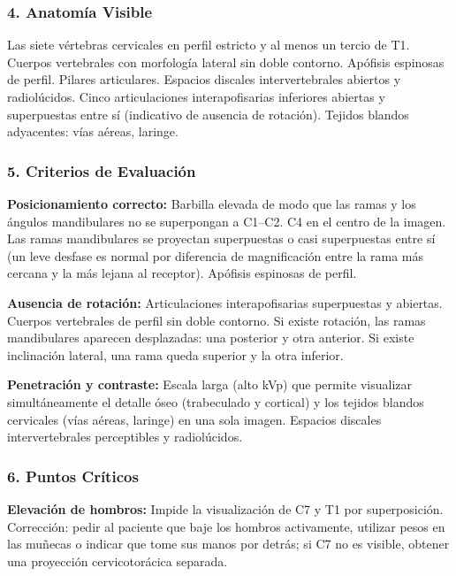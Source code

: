 		\subsubsection*{4. Anatomía Visible}
		
		Las siete vértebras cervicales en perfil estricto y al menos un tercio de T1. Cuerpos vertebrales con morfología lateral sin doble contorno. Apófisis espinosas de perfil. Pilares articulares. Espacios discales intervertebrales abiertos y radiolúcidos. Cinco articulaciones interapofisarias inferiores abiertas y superpuestas entre sí (indicativo de ausencia de rotación). Tejidos blandos adyacentes: vías aéreas, laringe.
		
		\subsubsection*{5. Criterios de Evaluación}
		
		\textbf{Posicionamiento correcto:} Barbilla elevada de modo que las ramas y los ángulos mandibulares no se superpongan a C1--C2. C4 en el centro de la imagen. Las ramas mandibulares se proyectan superpuestas o casi superpuestas entre sí (un leve desfase es normal por diferencia de magnificación entre la rama más cercana y la más lejana al receptor). Apófisis espinosas de perfil.
		
		\textbf{Ausencia de rotación:} Articulaciones interapofisarias superpuestas y abiertas. Cuerpos vertebrales de perfil sin doble contorno. Si existe rotación, las ramas mandibulares aparecen desplazadas: una posterior y otra anterior. Si existe inclinación lateral, una rama queda superior y la otra inferior.
		
		\textbf{Penetración y contraste:} Escala larga (alto kVp) que permite visualizar simultáneamente el detalle óseo (trabeculado y cortical) y los tejidos blandos cervicales (vías aéreas, laringe) en una sola imagen. Espacios discales intervertebrales perceptibles y radiolúcidos.
		
		\subsubsection*{6. Puntos Críticos}
		
		\textbf{Elevación de hombros:} Impide la visualización de C7 y T1 por superposición. Corrección: pedir al paciente que baje los hombros activamente, utilizar pesos en las muñecas o indicar que tome sus manos por detrás; si C7 no es visible, obtener una proyección cervicotorácica separada.
		
